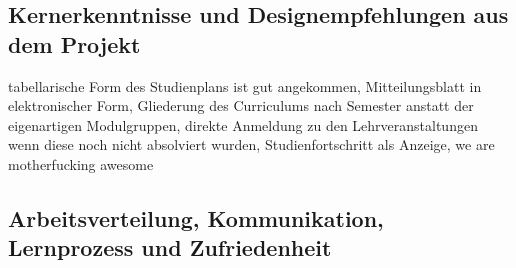 \documentclass[a4paper,10pt]{scrartcl}
\begin{document}
\subsection{Kernerkenntnisse und Designempfehlungen aus dem Projekt}

% 

tabellarische Form des Studienplans ist gut angekommen, Mitteilungsblatt in elektronischer Form, Gliederung des Curriculums nach Semester anstatt der eigenartigen
Modulgruppen, direkte Anmeldung zu den Lehrveranstaltungen wenn diese noch nicht absolviert wurden, Studienfortschritt als Anzeige, we are motherfucking awesome

\subsection{Arbeitsverteilung, Kommunikation, Lernprozess und Zufriedenheit}


\end{document}
